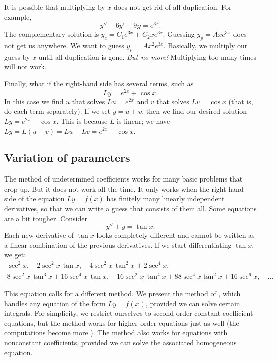 \medskip

It is possible that
multiplying by $x$ does not get rid of all
duplication.  For example,
\begin{equation*}
y''-6y'+9y = e^{3x} .
\end{equation*}
The complementary solution is
$y_c = C_1 e^{3x} + C_2 x e^{3x}$.  Guessing $y_p=A xe^{3x}$
does not get us anywhere.
We want to guess $y_p = Ax^2e^{3x}$.
Basically, we multiply our guess by $x$
until all duplication is gone.  \emph{But no more!}  Multiplying too many
times will not work.

\medskip

Finally, what if the right-hand side has several terms, such as
\begin{equation*}
Ly = e^{2x} + \cos x .
\end{equation*}
In this case we find $u$ that solves $Lu = e^{2x}$ and $v$ that
solves $Lv = \cos x$ (that is, do each term separately).
If we set
$y = u+ v$, then we find our desired solution $Ly = e^{2x} + \cos x$.
This is because $L$ is linear; we have
$Ly = L(u+v) = Lu + Lv = e^{2x} + \cos x$.

\subsection{Variation of parameters}

The method of undetermined coefficients works for many basic
problems that crop up.  But it does not work all the time.  It only works
when the right-hand side of the equation $Ly = f(x)$ has finitely many
linearly independent derivatives, so that we can write a guess that consists
of them all.  Some equations are a bit tougher.  Consider
\begin{equation*}
y''+y = \tan x .
\end{equation*}
Each new derivative of $\tan x$ looks completely different and
cannot be written as a linear combination of the previous derivatives.
If we start differentiating $\tan x$, we get:
\begin{multline*}
\sec^2 x, \quad
2\sec^2 x \, \tan x, \quad
4 \sec^2 x \, \tan^2 x + 2 \sec^4 x, \\
8 \sec^2 x \, \tan^3 x + 16 \sec^4 x \, \tan x, \quad
16\sec^2 x \, \tan^4 x + 88 \sec^4 x \tan^2 x + 16 \sec^6 x, \quad
\ldots
\end{multline*}

This equation calls for a different method.  We present the method of
\emph{}, which handles any equation of
the form $Ly = f(x)$,
provided we can solve certain integrals.  For simplicity, we restrict
ourselves to second order constant coefficient equations,
but the method works for higher
order equations just as well (the computations become more
). %
The method also works for equations with nonconstant coefficients,
provided we can solve the associated homogeneous equation.

